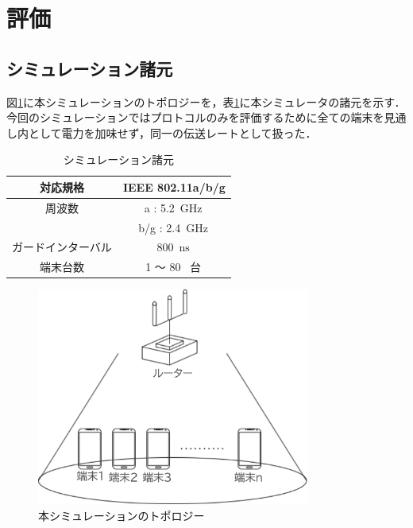 \documentclass[a4paper,10pt]{ltjsarticle}
\begin{document}
\clearpage
\section{評価}
\subsection{シミュレーション諸元}

図\ref{fig:topology}に本シミュレーションのトポロジーを，表\ref{tab:sim-base-param}に本シミュレータの諸元を示す．今回のシミュレーションではプロトコルのみを評価するために全ての端末を見通し内として電力を加味せず，同一の伝送レートとして扱った．

\begin{table}[H]
  \centering
  \caption{シミュレーション諸元}
  \label{tab:sim-base-param}
  \begin{tabular}{c|c}
    \hline
    対応規格 & IEEE 802.11a/b/g \\
    \hline
    周波数 & a : 5.2  \,$\mathrm{GHz}$\, \\
    & b/g : 2.4  \,$\mathrm{GHz}$\, \\
    \hline
    ガードインターバル & 800  \,$\mathrm{ns}$\, \\
    \hline
    端末台数 & 1 ～ 80 \, 台\, \\
    \hline
  \end{tabular}
\end{table}

\begin{figure}[H]
  \centering
  \includegraphics[width=0.8\textwidth]{./assets/topology.png}
  \caption{本シミュレーションのトポロジー}
  \label{fig:topology}
\end{figure}
\end{document}

